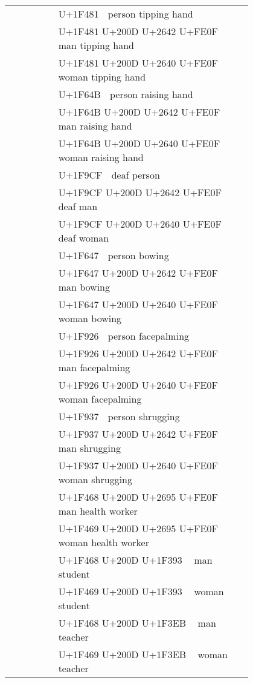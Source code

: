 \documentclass[a4paper,12pt]{article}
\newcommand{\fontA}[1]{{\fontspec[RawFeature={dist,ccmp}]{Segoe UI Emoji} #1}}
\newcommand{\fontB}[1]{{\fontspec[Ligatures=Common,RawFeature={+ccmp}]{Symbola_Hinted.ttf} #1}}
\begin{document}
\begin{longtable}[c]{ccp{0.8\linewidth}}
\fontA{💁}&\fontB{💁}&U+1F481 💁 person tipping hand\\
\fontA{💁‍♂️}&\fontB{💁‍♂️}&U+1F481 U+200D U+2642 U+FE0F 💁‍♂️ man tipping hand\\
\fontA{💁‍♀️}&\fontB{💁‍♀️}&U+1F481 U+200D U+2640 U+FE0F 💁‍♀️ woman tipping hand\\
\fontA{🙋}&\fontB{🙋}&U+1F64B 🙋 person raising hand\\
\fontA{🙋‍♂️}&\fontB{🙋‍♂️}&U+1F64B U+200D U+2642 U+FE0F 🙋‍♂️ man raising hand\\
\fontA{🙋‍♀️}&\fontB{🙋‍♀️}&U+1F64B U+200D U+2640 U+FE0F 🙋‍♀️ woman raising hand\\
\fontA{🧏}&\fontB{🧏}&U+1F9CF 🧏 deaf person\\
\fontA{🧏‍♂️}&\fontB{🧏‍♂️}&U+1F9CF U+200D U+2642 U+FE0F 🧏‍♂️ deaf man\\
\fontA{🧏‍♀️}&\fontB{🧏‍♀️}&U+1F9CF U+200D U+2640 U+FE0F 🧏‍♀️ deaf woman\\
\fontA{🙇}&\fontB{🙇}&U+1F647 🙇 person bowing\\
\fontA{🙇‍♂️}&\fontB{🙇‍♂️}&U+1F647 U+200D U+2642 U+FE0F 🙇‍♂️ man bowing\\
\fontA{🙇‍♀️}&\fontB{🙇‍♀️}&U+1F647 U+200D U+2640 U+FE0F 🙇‍♀️ woman bowing\\
\fontA{🤦}&\fontB{🤦}&U+1F926 🤦 person facepalming\\
\fontA{🤦‍♂️}&\fontB{🤦‍♂️}&U+1F926 U+200D U+2642 U+FE0F 🤦‍♂️ man facepalming\\
\fontA{🤦‍♀️}&\fontB{🤦‍♀️}&U+1F926 U+200D U+2640 U+FE0F 🤦‍♀️ woman facepalming\\
\fontA{🤷}&\fontB{🤷}&U+1F937 🤷 person shrugging\\
\fontA{🤷‍♂️}&\fontB{🤷‍♂️}&U+1F937 U+200D U+2642 U+FE0F 🤷‍♂️ man shrugging\\
\fontA{🤷‍♀️}&\fontB{🤷‍♀️}&U+1F937 U+200D U+2640 U+FE0F 🤷‍♀️ woman shrugging\\
\fontA{👨‍⚕️}&\fontB{👨‍⚕️}&U+1F468 U+200D U+2695 U+FE0F 👨‍⚕️ man health worker\\
\fontA{👩‍⚕️}&\fontB{👩‍⚕️}&U+1F469 U+200D U+2695 U+FE0F 👩‍⚕️ woman health worker\\
\fontA{👨‍🎓}&\fontB{👨‍🎓}&U+1F468 U+200D U+1F393 👨‍🎓 man student\\
\fontA{👩‍🎓}&\fontB{👩‍🎓}&U+1F469 U+200D U+1F393 👩‍🎓 woman student\\
\fontA{👨‍🏫}&\fontB{👨‍🏫}&U+1F468 U+200D U+1F3EB 👨‍🏫 man teacher\\
\fontA{👩‍🏫}&\fontB{👩‍🏫}&U+1F469 U+200D U+1F3EB 👩‍🏫 woman teacher\\

\end{longtable}
\end{document}
